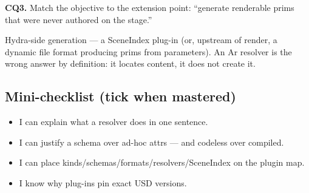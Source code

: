 \noindent\textbf{CQ3.} Match the objective to the extension point:
``generate renderable prims that were never authored on the stage.''
\begin{DrillSolution}
Hydra-side generation --- a SceneIndex plug-in (or, upstream of render, a
dynamic file format producing prims from parameters). An Ar resolver is the
wrong answer by definition: it locates content, it does not create it.
\end{DrillSolution}

\subsection*{Mini-checklist (tick when mastered)}
\begin{itemize}[leftmargin=*]
  \item[$\square$] I can explain what a resolver does in one sentence.
  \item[$\square$] I can justify a schema over ad-hoc attrs --- and codeless over compiled.
  \item[$\square$] I can place kinds/schemas/formats/resolvers/SceneIndex on the plugin map.
  \item[$\square$] I know why plug-ins pin exact USD versions.
\end{itemize}
